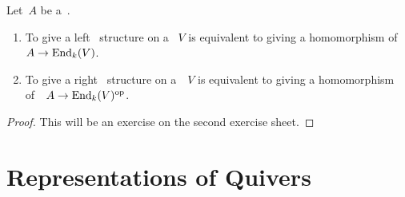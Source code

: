 \begin{proposition}
  Let~$A$ be a~{\kalg}.
  \begin{enumerate}
    \item
      To give a left~{} structure on a~{\module{$\kf$}} $V$ is equivalent to giving a homomorphism of~{\kalg}~$A \to \operatorname{End}_k(V)$.
    \item
      To give a right~{} structure on a~{\module{$\kf$}}~$V$ is equivalent to giving a homomorphism of~{\kalg}~$A \to \operatorname{End}_k(V)^{\mathrm{op}}$.
  \end{enumerate}
\end{proposition}


\begin{proof}
  This will be an exercise on the second exercise sheet.
\end{proof}










\section{Representations of Quivers}


